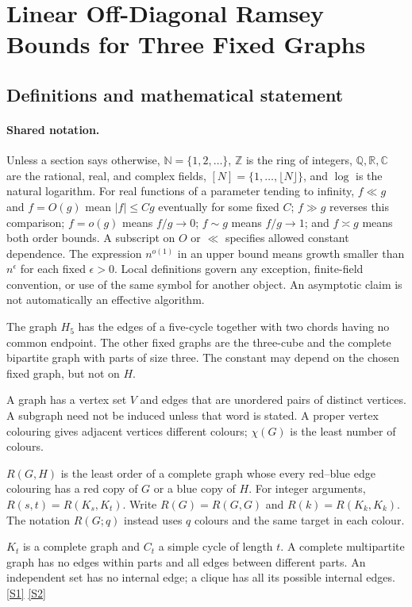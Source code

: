 \documentclass[11pt,a4paper]{article}
\newcommand{\N}{\mathbb{N}}
\newcommand{\Z}{\mathbb{Z}}
\newcommand{\Q}{\mathbb{Q}}
\newcommand{\R}{\mathbb{R}}
\newcommand{\C}{\mathbb{C}}
\newcommand{\sref}[2]{\hyperlink{source:#1:#2}{[S#2]}}
\begin{document}
\section{Linear Off-Diagonal Ramsey Bounds for Three Fixed Graphs}\label{statement}


\subsection{Definitions and mathematical statement}

\paragraph{Shared notation.}Unless a section says otherwise, $\N=\{1,2,\ldots\}$,
$\Z$ is the ring of integers, $\Q,\R,\C$ are the rational, real, and complex
fields, $[N]=\{1,\ldots,\lfloor N\rfloor\}$, and $\log$ is the natural
logarithm. For real functions of a parameter tending to infinity,
$f\ll g$ and $f=O(g)$ mean $|f|\leq Cg$ eventually for some fixed $C$;
$f\gg g$ reverses this comparison; $f=o(g)$ means $f/g\to0$;
$f\sim g$ means $f/g\to1$; and $f\asymp g$ means both order bounds.
A subscript on $O$ or $\ll$ specifies allowed constant dependence.
The expression $n^{o(1)}$ in an upper bound means growth smaller than
$n^\epsilon$ for each fixed $\epsilon>0$. Local definitions govern any
exception, finite-field convention, or use of the same symbol for another
object. An asymptotic claim is not automatically an effective algorithm.



The graph $H_5$ has the edges of a five-cycle together with two chords having no common endpoint. The other fixed graphs are the three-cube and the complete bipartite graph with parts of size three. The constant may depend on the chosen fixed graph, but not on $H$.

A graph has a vertex set $V$ and edges that are unordered pairs of distinct vertices. A subgraph need not be induced unless that word is stated. A proper vertex colouring gives adjacent vertices different colours; $\chi(G)$ is the least number of colours.

$R(G,H)$ is the least order of a complete graph whose every red--blue edge colouring has a red copy of $G$ or a blue copy of $H$. For integer arguments, $R(s,t)=R(K_s,K_t)$. Write $R(G)=R(G,G)$ and $R(k)=R(K_k,K_k)$. The notation $R(G;q)$ instead uses $q$ colours and the same target in each colour.

$K_t$ is a complete graph and $C_t$ a simple cycle of length $t$. A complete multipartite graph has no edges within parts and all edges between different parts. An independent set has no internal edge; a clique has all its possible internal edges. \sref{statement}{1} \sref{statement}{2}
\end{document}
